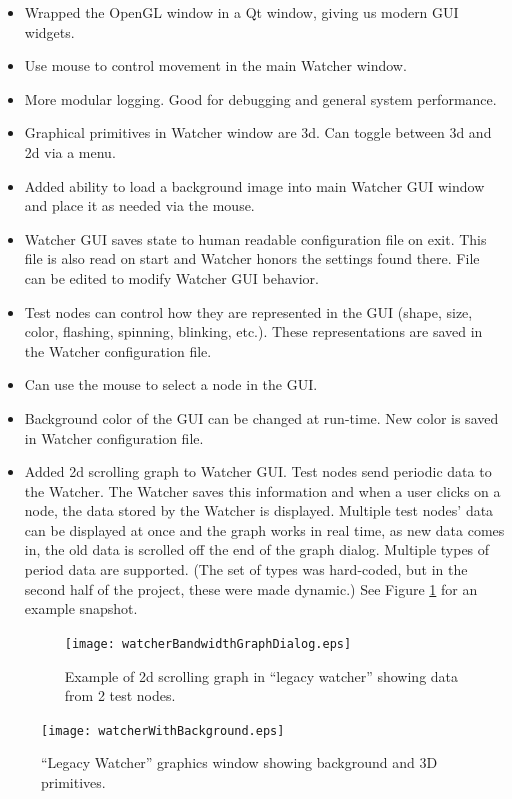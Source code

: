 \documentclass{report}
\begin{document}
\begin{itemize}
\item Wrapped the OpenGL window in a Qt window, giving us modern GUI widgets. 
\item Use mouse to control movement in the main Watcher window.
\item More modular logging. Good for debugging and general system performance.
\item Graphical primitives in Watcher window are 3d. Can toggle between 3d and 2d via a menu.
\item Added ability to load a background image into main Watcher GUI window and place it as needed via the mouse.
\item Watcher GUI saves state to human readable configuration file on exit. This file is also read on start and Watcher honors the 
settings found there. File can be edited to modify Watcher GUI behavior.
\item Test nodes can control how they are represented in the GUI (shape, size, color, flashing, spinning, blinking, etc.). These representations
are saved in the Watcher configuration file.
\item Can use the mouse to select a node in the GUI.

\item Background color of the GUI can be changed at run-time. New color is saved in Watcher configuration file.
\item Added 2d scrolling graph to Watcher GUI. Test nodes send periodic data to the Watcher. The Watcher saves this information and when 
a user clicks on a node, the data stored by the Watcher is displayed. Multiple test nodes' data can be displayed at once and the graph
works in real time, as new data comes in, the old data is scrolled off the end of the graph dialog. Multiple types of period data 
are supported.  (The set of types was hard-coded, but in the second half of the project, these were made dynamic.) See Figure \ref{fig:watcherBandwidthGraphDialog} 
for an example snapshot.

\begin{figure}[htb]
\centering
\texttt{[image: watcherBandwidthGraphDialog.eps]}
\caption{Example of 2d scrolling graph in ``legacy watcher'' showing data from 2 test nodes.}
\label{fig:watcherBandwidthGraphDialog}
\end{figure}

\end{itemize}

\begin{figure}[htb]
\centering
\texttt{[image: watcherWithBackground.eps]}
\caption{``Legacy Watcher'' graphics window showing background and 3D primitives.}
\label{fig:watcherWithBackground}
\end{figure}
\end{document}
